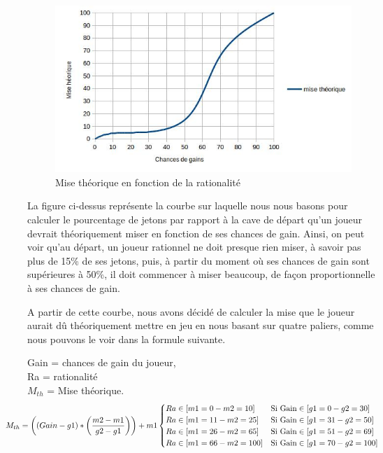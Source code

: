 \documentclass{report}
\begin{document}
\begin{figure}[H]
	\begin{center}
		\includegraphics[scale=0.5]{./imagesRapport/courbeRationaliteMiseTheorique.jpg}
	\end{center}
	\caption[Mise théorique en fonction de la rationalité]{Mise théorique en fonction de la rationalité}
\end{figure}

La figure ci-dessus représente la courbe sur laquelle nous nous basons pour calculer le pourcentage de jetons par rapport à la cave de départ qu'un joueur devrait théoriquement miser en fonction de ses chances de gain. Ainsi, on peut voir qu'au départ, un joueur rationnel ne doit presque rien miser, à savoir pas plus de 15\% de ses jetons, puis, à partir du moment où ses chances de gain sont supérieures à 50\%, il doit commencer à miser beaucoup, de façon proportionnelle à ses chances de gain.

A partir de cette courbe, nous avons décidé de calculer la mise que le joueur aurait dû théoriquement mettre en jeu en nous basant sur quatre paliers, comme nous pouvons le voir dans la formule suivante. \par

\small{
 	Gain = chances de gain du joueur,\\
Ra = rationalité\\
$M_{th}$ = Mise théorique.\\

\begin{align*}
	\hspace{-1cm}M_{th} = \left((Gain - g1) * \left(\frac{m2-m1}{g2-g1}\right)\right)+m1
	\begin{cases}
		Ra \in [m1=0 - m2=10] &\text{Si Gain} \in [g1=0 - g2=30]\\
		Ra \in [m1=11 - m2=25] &\text{Si Gain} \in [g1=31 - g2=50]\\
		Ra \in [m1=26 - m2=65] &\text{Si Gain} \in [g1=51 - g2=69]\\
		Ra \in [m1=66 - m2=100] &\text{Si Gain} \in [g1=70 - g2=100]\\
	\end{cases}
\end{align*}
}
\end{document}

